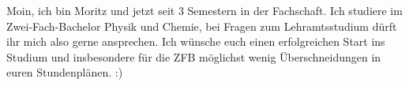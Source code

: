 \begin{multicols}{2}
{
Moin, ich bin Moritz und jetzt seit 3 Semestern in der Fachschaft. Ich studiere im Zwei-Fach-Bachelor Physik und Chemie, bei Fragen zum Lehramtsstudium dürft ihr mich also gerne ansprechen. 
Ich wünsche euch einen erfolgreichen Start ins Studium und insbesondere für die ZFB möglichst wenig Überschneidungen in euren Stundenplänen. :)
}


\end{multicols}

